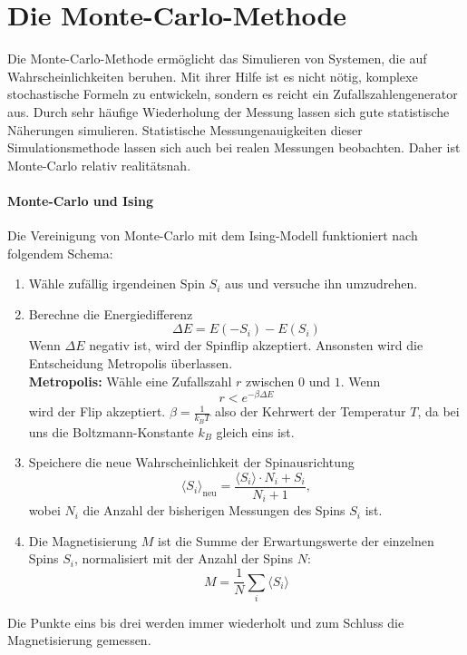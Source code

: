 \section{Die Monte-Carlo-Methode}
Die Monte-Carlo-Methode ermöglicht das Simulieren von Systemen, die auf Wahrscheinlichkeiten beruhen.
Mit ihrer Hilfe ist es nicht nötig, komplexe stochastische Formeln zu entwickeln, sondern es reicht ein Zufallszahlengenerator aus.
Durch sehr häufige Wiederholung der Messung lassen sich gute statistische Näherungen simulieren.
Statistische Messungenauigkeiten dieser Simulationsmethode lassen sich auch bei realen Messungen beobachten. Daher ist Monte-Carlo relativ realitätsnah.

\paragraph{Monte-Carlo und Ising}
Die Vereinigung von Monte-Carlo mit dem Ising-Modell funktioniert nach folgendem Schema:
\begin{enumerate}
 \item Wähle zufällig irgendeinen Spin $S_i$ aus und versuche ihn umzudrehen.

 \item Berechne die Energiedifferenz
		\begin{equation}
		  \Delta E = E(-S_i) - E(S_i)
		\end{equation}
		Wenn $\Delta E$ negativ ist, wird der Spinflip akzeptiert.
		Ansonsten wird die Entscheidung Metropolis überlassen.\\
		\textbf{Metropolis:} Wähle eine Zufallszahl $r$ zwischen $0$ und $1$.
		Wenn
		\begin{equation}
		  r<e^{-\beta \Delta E}
		\end{equation}
		wird der Flip akzeptiert. $\beta=\frac{1}{k_B T}$ also der Kehrwert der Temperatur $T$, da bei uns die Boltzmann-Konstante $k_B$ gleich eins ist.

 \item Speichere die neue Wahrscheinlichkeit der Spinausrichtung
		\begin{equation}
		  \langle S_i \rangle_{\text{neu}} = \frac{\langle S_i \rangle \cdot N_i + S_i}{N_i + 1},
		\end{equation}
		wobei $N_i$ die Anzahl der bisherigen Messungen des Spins $S_i$ ist.

 \item Die Magnetisierung $M$ ist die Summe der Erwartungswerte der einzelnen Spins $S_i$, normalisiert mit der Anzahl der Spins $N$:
		\begin{equation}
		  M = \frac 1N \sum_i \langle S_i \rangle
		\end{equation}
\end{enumerate}
Die Punkte eins bis drei werden immer wiederholt und zum Schluss die Magnetisierung gemessen.
